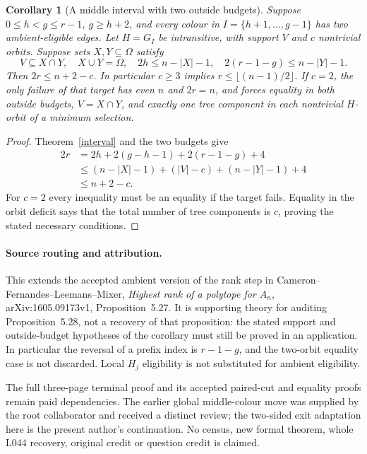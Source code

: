 \documentclass[11pt,a4paper]{article}
\newtheorem{corollary}[theorem]{Corollary}
\begin{document}
\begin{corollary}[A middle interval with two outside budgets]
Suppose $0\leq h<g\leq r-1$, $g\geq h+2$, and every colour
in $I=\{h+1,\ldots,g-1\}$ has two ambient-eligible edges.
Let $H=G_I$ be intransitive, with support $V$ and $c$ nontrivial
orbits. Suppose sets $X,Y\subseteq\Omega$ satisfy
\[
 V\subseteq X\cap Y,\quad X\cup Y=\Omega,\quad
 2h\leq n-|X|-1,\quad 2(r-1-g)\leq n-|Y|-1.
\]
Then $2r\leq n+2-c$. In particular $c\geq3$ implies
$r\leq\lfloor(n-1)/2\rfloor$. If $c=2$, the only failure
of that target has even $n$ and $2r=n$, and forces equality
in both outside budgets, $V=X\cap Y$, and exactly one tree
component in each nontrivial $H$-orbit of a minimum selection.
\end{corollary}
\begin{proof}
Theorem~\ref{interval} and the two budgets give
\[
\begin{split}
2r&=2h+2(g-h-1)+2(r-1-g)+4\\
&\leq(n-|X|-1)+(|V|-c)+(n-|Y|-1)+4\\
&\leq n+2-c.
\end{split}
\]
For $c=2$ every inequality must be an equality if the target fails.
Equality in the orbit deficit says that the total number of tree
components is $c$, proving the stated necessary conditions.
\end{proof}

\paragraph{Source routing and attribution.}
This extends the accepted ambient version of the rank step in
Cameron--Fernandes--Leemans--Mixer, \emph{Highest rank of a polytope
for $A_n$}, arXiv:1605.09173v1, Proposition~5.27. It is supporting
theory for auditing Proposition~5.28, not a recovery of that
proposition: the stated support and outside-budget hypotheses of the
corollary must still be proved in an application. In particular the
reversal of a prefix index is $r-1-g$, and the two-orbit equality
case is not discarded. Local $H_j$ eligibility is not substituted
for ambient eligibility.

The full three-page terminal proof and its accepted paired-cut and
equality proofs remain paid dependencies. The earlier global
middle-colour move was supplied by the root collaborator and received
a distinct review; the two-sided exit adaptation here is the present
author's continuation. No census, new formal theorem, whole L044
recovery, original credit or question credit is claimed.
\end{document}
